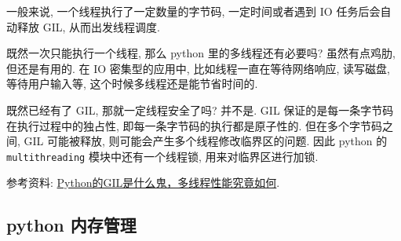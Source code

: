 一般来说, 一个线程执行了一定数量的字节码, 一定时间或者遇到 IO 任务后会自动释放 GIL, 从而出发线程调度. 

既然一次只能执行一个线程, 那么 python 里的多线程还有必要吗? 虽然有点鸡肋, 但还是有用的. 在 IO 密集型的应用中, 比如线程一直在等待网络响应, 读写磁盘, 等待用户输入等, 这个时候多线程还是能节省时间的.

既然已经有了 GIL, 那就一定线程安全了吗? 并不是. GIL 保证的是每一条字节码在执行过程中的独占性, 即每一条字节码的执行都是原子性的. 但在多个字节码之间, GIL 可能被释放, 则可能会产生多个线程修改临界区的问题. 因此 python 的 \texttt{multithreading} 模块中还有一个线程锁, 用来对临界区进行加锁.

参考资料: \href{http://cenalulu.github.io/python/gil-in-python/#:~:text=GIL%E5%85%A8%E7%A7%B0Global%20Interpreter%20Lock%E4%B8%BA%E4%BA%86%E9%81%BF%E5%85%8D%E8%AF%AF%E5%AF%BC%EF%BC%8C%E6%88%91%E4%BB%AC%E8%BF%98%E6%98%AF%E6%9D%A5%E7%9C%8B%E4%B8%80%E4%B8%8B%E5%AE%98%E6%96%B9%E7%BB%99%E5%87%BA%E7%9A%84%E8%A7%A3%E9%87%8A%EF%BC%9A%20In%20CPython%2C%20the%20global%20interpreter,mainly%20because%20CPython%E2%80%99s%20memory%20management%20is%20not%20thread-safe.}{Python的GIL是什么鬼，多线程性能究竟如何}.
	
\subsection{python 内存管理}